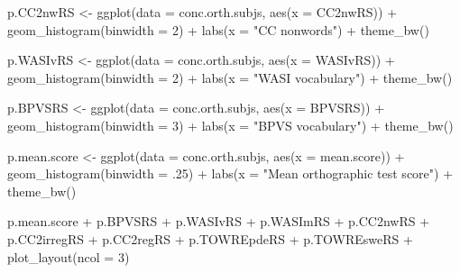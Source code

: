 \documentclass[
  letterpaper,
  DIV=11,
  numbers=noendperiod]{scrreprt}
\newenvironment{Shaded}{\begin{snugshade}}{\end{snugshade}}
\newcommand{\AttributeTok}[1]{\textcolor[rgb]{0.40,0.45,0.13}{#1}}
\newcommand{\DecValTok}[1]{\textcolor[rgb]{0.68,0.00,0.00}{#1}}
\newcommand{\FunctionTok}[1]{\textcolor[rgb]{0.28,0.35,0.67}{#1}}
\newcommand{\NormalTok}[1]{\textcolor[rgb]{0.00,0.23,0.31}{#1}}
\newcommand{\OtherTok}[1]{\textcolor[rgb]{0.00,0.23,0.31}{#1}}
\newcommand{\SpecialCharTok}[1]{\textcolor[rgb]{0.37,0.37,0.37}{#1}}
\newcommand{\StringTok}[1]{\textcolor[rgb]{0.13,0.47,0.30}{#1}}
\begin{document}
\begin{Shaded}
\begin{Highlighting}[numbers=left,,]
\NormalTok{p.CC2nwRS }\OtherTok{\textless{}{-}} \FunctionTok{ggplot}\NormalTok{(}\AttributeTok{data =}\NormalTok{ conc.orth.subjs, }\FunctionTok{aes}\NormalTok{(}\AttributeTok{x =}\NormalTok{ CC2nwRS)) }\SpecialCharTok{+}
  \FunctionTok{geom\_histogram}\NormalTok{(}\AttributeTok{binwidth =} \DecValTok{2}\NormalTok{) }\SpecialCharTok{+}
  \FunctionTok{labs}\NormalTok{(}\AttributeTok{x =} \StringTok{"CC nonwords"}\NormalTok{) }\SpecialCharTok{+}
  \FunctionTok{theme\_bw}\NormalTok{()}

\NormalTok{p.WASIvRS }\OtherTok{\textless{}{-}} \FunctionTok{ggplot}\NormalTok{(}\AttributeTok{data =}\NormalTok{ conc.orth.subjs, }\FunctionTok{aes}\NormalTok{(}\AttributeTok{x =}\NormalTok{ WASIvRS)) }\SpecialCharTok{+}
  \FunctionTok{geom\_histogram}\NormalTok{(}\AttributeTok{binwidth =} \DecValTok{2}\NormalTok{) }\SpecialCharTok{+}
  \FunctionTok{labs}\NormalTok{(}\AttributeTok{x =} \StringTok{"WASI vocabulary"}\NormalTok{) }\SpecialCharTok{+}
  \FunctionTok{theme\_bw}\NormalTok{()}

\NormalTok{p.BPVSRS }\OtherTok{\textless{}{-}} \FunctionTok{ggplot}\NormalTok{(}\AttributeTok{data =}\NormalTok{ conc.orth.subjs, }\FunctionTok{aes}\NormalTok{(}\AttributeTok{x =}\NormalTok{ BPVSRS)) }\SpecialCharTok{+}
  \FunctionTok{geom\_histogram}\NormalTok{(}\AttributeTok{binwidth =} \DecValTok{3}\NormalTok{) }\SpecialCharTok{+}
  \FunctionTok{labs}\NormalTok{(}\AttributeTok{x =} \StringTok{"BPVS vocabulary"}\NormalTok{) }\SpecialCharTok{+}
  \FunctionTok{theme\_bw}\NormalTok{()}

\NormalTok{p.mean.score }\OtherTok{\textless{}{-}} \FunctionTok{ggplot}\NormalTok{(}\AttributeTok{data =}\NormalTok{ conc.orth.subjs, }\FunctionTok{aes}\NormalTok{(}\AttributeTok{x =}\NormalTok{ mean.score)) }\SpecialCharTok{+}
  \FunctionTok{geom\_histogram}\NormalTok{(}\AttributeTok{binwidth =}\NormalTok{ .}\DecValTok{25}\NormalTok{) }\SpecialCharTok{+}
  \FunctionTok{labs}\NormalTok{(}\AttributeTok{x =} \StringTok{"Mean orthographic test score"}\NormalTok{) }\SpecialCharTok{+}
  \FunctionTok{theme\_bw}\NormalTok{()}

\NormalTok{p.mean.score }\SpecialCharTok{+}\NormalTok{ p.BPVSRS }\SpecialCharTok{+}\NormalTok{ p.WASIvRS }\SpecialCharTok{+}\NormalTok{ p.WASImRS }\SpecialCharTok{+}
\NormalTok{  p.CC2nwRS }\SpecialCharTok{+}\NormalTok{ p.CC2irregRS }\SpecialCharTok{+}\NormalTok{ p.CC2regRS }\SpecialCharTok{+} 
\NormalTok{  p.TOWREpdeRS }\SpecialCharTok{+}\NormalTok{ p.TOWREsweRS }\SpecialCharTok{+} \FunctionTok{plot\_layout}\NormalTok{(}\AttributeTok{ncol =} \DecValTok{3}\NormalTok{)}
\end{Highlighting}
\end{Shaded}
\end{document}
